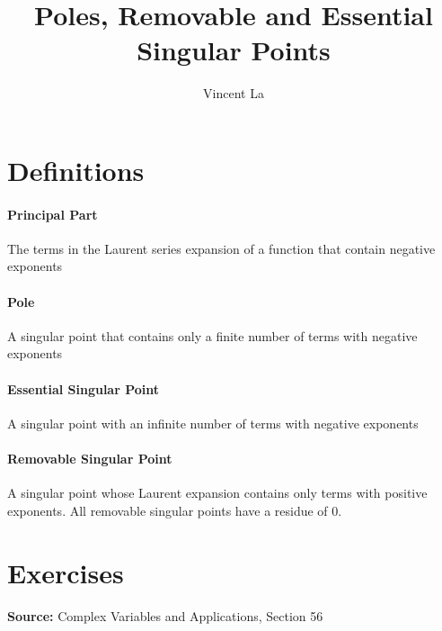 \documentclass[]{article}
\title{Poles, Removable and Essential Singular Points}
\author{Vincent La}
\begin{document}
\maketitle

\section{Definitions}
\paragraph{Principal Part} The terms in the Laurent series expansion of a function that contain negative exponents

\paragraph{Pole} A singular point that contains only a finite number of terms with negative exponents

\paragraph{Essential Singular Point} A singular point with an infinite number of terms with negative exponents

\paragraph{Removable Singular Point} A singular point whose Laurent expansion contains only terms with positive exponents. All removable singular points have a residue of 0.

\section{Exercises}
\textbf{Source:} Complex Variables and Applications, Section 56
\end{document}
